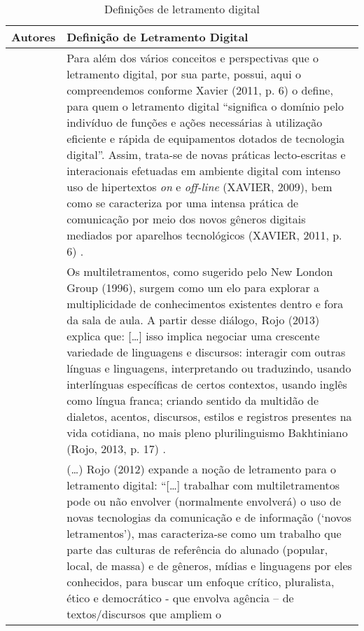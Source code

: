 \begin{small}
\begin{longtable}{p{} p{}}
\caption{Definições de letramento digital}
\label{tab-02}\\
\toprule
Autores & Definição de Letramento Digital \\
\midrule
\endhead

\textcite{oliveira2018multiletramentos} & Para além dos vários conceitos e
    perspectivas que o letramento digital, por sua parte, possui, aqui o
    compreendemos conforme Xavier (2011, p. 6) o define, para quem o
    letramento digital ``significa o domínio pelo indivíduo de funções e
    ações necessárias à utilização eficiente e rápida de equipamentos
    dotados de tecnologia digital''. Assim, trata-se de novas práticas
    lecto-escritas e interacionais efetuadas em ambiente digital com intenso
    uso de hipertextos \emph{on} e \emph{off-line} (XAVIER, 2009), bem como
    se caracteriza por uma intensa prática de comunicação por meio dos novos
    gêneros digitais mediados por aparelhos tecnológicos (XAVIER, 2011, p.
    6) \cite[p.253]{oliveira2018multiletramentos}. \\
    \textcite{valadares2021videogames} & Os multiletramentos, como sugerido pelo New
    London Group (1996), surgem como um elo para explorar a multiplicidade
    de conhecimentos existentes dentro e fora da sala de aula. A partir
    desse diálogo, Rojo (2013) explica que: {[}\ldots{]} isso implica negociar
    uma crescente variedade de linguagens e discursos: interagir com outras
    línguas e linguagens, interpretando ou traduzindo, usando interlínguas
    específicas de certos contextos, usando inglês como língua franca;
    criando sentido da multidão de dialetos, acentos, discursos, estilos e
    registros presentes na vida cotidiana, no mais pleno plurilinguismo
    Bakhtiniano (Rojo, 2013, p. 17) \cite[p.~213]{valadares2021videogames}. \\
    \textcite{xavier2019construcao} & (\ldots) Rojo (2012) expande a noção de
    letramento para o letramento digital: ``{[}\ldots{]} trabalhar com
    multiletramentos pode ou não envolver (normalmente envolverá) o uso de
    novas tecnologias da comunicação e de informação (`novos letramentos'),
    mas caracteriza-se como um trabalho que parte das culturas de referência
    do alunado (popular, local, de massa) e de gêneros, mídias e linguagens
    por eles conhecidos, para buscar um enfoque crítico, pluralista, ético e
    democrático - que envolva agência -- de textos/discursos que ampliem o

\end{longtable}
\end{small}

